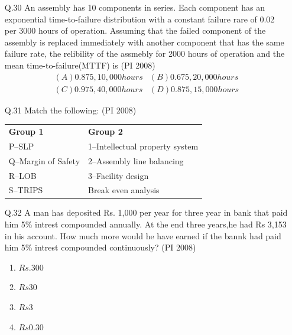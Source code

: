\documentclass[journal,12pt,onecolumn]{IEEEtran}
\theoremstyle{remark}
\begin{document}
\begin{enumerate}
 \item[\textnormal{Q.30}]  An assembly has 10 components in series. Each component has an exponential time-to-failure distribution with a constant failure rare of 0.02 per 3000 hours of operation. Assuming that the failed component of the assembly is replaced immediately with another component that has the same failure rate, the relibility of the assmebly for 2000 hours of operation and the mean time-to-failure(MTTF) is 
    \hfill{(PI 2008)}
    \[
    \begin{matrix}
        {(A) 0.875,10,000 hours } & {(B)0.675,20,000 hours}\\
        {(C)0.975,40,000 hours}  & {(D)0.875,15,000 hours}
    \end{matrix}
    \]
    \vspace{1cm}
    \item[\textnormal{Q.31}] Match the following: 
    \hfill{(PI 2008)}\\
    \vspace{1cm}
    \begin{tabular}{p{4cm} p{6cm}}
\textbf{Group 1} & \textbf{Group 2} \\
    P--SLP                  & 1--Intellectual property system \\
    Q--Margin of Safety     & 2--Assembly line balancing\\
    R--LOB                  & 3--Facility design\\
    S--TRIPS                & Break even analysis\\
    \end{tabular}
    \vspace{1cm}
     \item[\textnormal{Q.32}]  A man has deposited Rs. 1,000 per year for three year in bank that paid him 5\% intrest compounded annually. At the end three years,he had Rs 3,153 in his account. How much more would he have earned if the bannk had paid him 5\% intrest compounded continuously?
    \hfill{(PI 2008)}
    \begin{multicols}{4}
    \begin{enumerate}[label=(\Alph*)]
        \item $Rs.300$
        \item $Rs30$
        \item $Rs3$
        \item $Rs0.30$
    \end{enumerate}
\end{multicols}
\vspace{1cm}


\end{enumerate}
\end{document}
